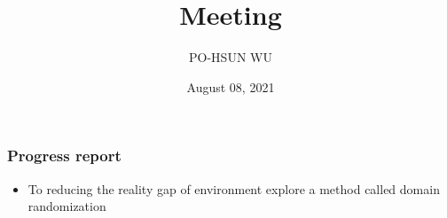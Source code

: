 \documentclass{beamer}
\date{August 08, 2021}
\title{Meeting}
\author{PO-HSUN WU}
\begin{document}
    \frame{\titlepage}

    \begin{frame}
        \frametitle{Progress report}
        \begin{itemize}
            \item To reducing the reality gap of environment explore a method called domain randomization
        \end{itemize}
    \end{frame}
\end{document}
